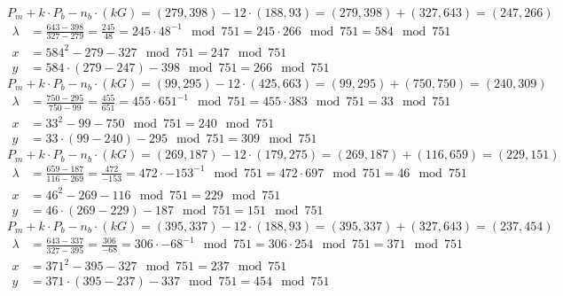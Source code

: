 $P_m + k \cdot P_b - n_b \cdot (kG) = (279, 398) - 12 \cdot (188, 93) = (279, 398) + (327, 643)=(247, 266)$
\begin{equation*}
	\begin{aligned}
		\lambda &= \frac{643-398}{327-279} = \frac{245}{48} = 245 \cdot 48^{-1}\mod{751} = 245 \cdot 266\mod{751} = 584\mod{751} \\
		x &= 584^2 - 279 - 327 \mod{751} = 247\mod{751} \\
		y &= 584 \cdot (279 - 247) - 398\mod{751} = 266\mod{751}
	\end{aligned}
\end{equation*}
$P_m + k \cdot P_b - n_b \cdot (kG) = (99, 295) - 12 \cdot (425, 663) = (99, 295) + (750, 750)=(240, 309)$
\begin{equation*}
	\begin{aligned}
		\lambda &= \frac{750-295}{750-99} = \frac{455}{651} = 455 \cdot 651^{-1}\mod{751} = 455 \cdot 383\mod{751} = 33\mod{751} \\
		x &= 33^2 - 99 - 750 \mod{751} = 240\mod{751} \\
		y &= 33 \cdot (99 - 240) - 295\mod{751} = 309\mod{751}
	\end{aligned}
\end{equation*}
$P_m + k \cdot P_b - n_b \cdot (kG) = (269, 187) - 12 \cdot (179, 275) = (269, 187) + (116, 659)=(229, 151)$
\begin{equation*}
	\begin{aligned}
		\lambda &= \frac{659-187}{116-269} = \frac{472}{-153} = 472 \cdot -153^{-1}\mod{751} = 472 \cdot 697\mod{751} = 46\mod{751} \\
		x &= 46^2 - 269 - 116 \mod{751} = 229\mod{751} \\
		y &= 46 \cdot (269 - 229) - 187\mod{751} = 151\mod{751}
	\end{aligned}
\end{equation*}
$P_m + k \cdot P_b - n_b \cdot (kG) = (395, 337) - 12 \cdot (188, 93) = (395, 337) + (327, 643)=(237, 454)$
\begin{equation*}
	\begin{aligned}
		\lambda &= \frac{643-337}{327-395} = \frac{306}{-68} = 306 \cdot -68^{-1}\mod{751} = 306 \cdot 254\mod{751} = 371\mod{751} \\
		x &= 371^2 - 395 - 327 \mod{751} = 237\mod{751} \\
		y &= 371 \cdot (395 - 237) - 337\mod{751} = 454\mod{751}
	\end{aligned}
\end{equation*}
